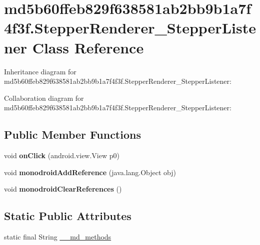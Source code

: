 \hypertarget{classmd5b60ffeb829f638581ab2bb9b1a7f4f3f_1_1_stepper_renderer___stepper_listener}{}\section{md5b60ffeb829f638581ab2bb9b1a7f4f3f.\+Stepper\+Renderer\+\_\+\+Stepper\+Listener Class Reference}
\label{classmd5b60ffeb829f638581ab2bb9b1a7f4f3f_1_1_stepper_renderer___stepper_listener}


Inheritance diagram for md5b60ffeb829f638581ab2bb9b1a7f4f3f.\+Stepper\+Renderer\+\_\+\+Stepper\+Listener\+:


Collaboration diagram for md5b60ffeb829f638581ab2bb9b1a7f4f3f.\+Stepper\+Renderer\+\_\+\+Stepper\+Listener\+:
\subsection*{Public Member Functions}
\begin{DoxyCompactItemize}
\item 
\mbox{\label{classmd5b60ffeb829f638581ab2bb9b1a7f4f3f_1_1_stepper_renderer___stepper_listener_ae013c0b5135d142b2c9092cba4e62af7}} 
void {\bfseries on\+Click} (android.\+view.\+View p0)
\item 
\mbox{\label{classmd5b60ffeb829f638581ab2bb9b1a7f4f3f_1_1_stepper_renderer___stepper_listener_aca2b5ea54afcdc9bbf86f2ca4d46b151}} 
void {\bfseries monodroid\+Add\+Reference} (java.\+lang.\+Object obj)
\item 
\mbox{\label{classmd5b60ffeb829f638581ab2bb9b1a7f4f3f_1_1_stepper_renderer___stepper_listener_aac50e9b6e66f8dcc19a5b7dfe491dad0}} 
void {\bfseries monodroid\+Clear\+References} ()
\end{DoxyCompactItemize}
\subsection*{Static Public Attributes}
\begin{DoxyCompactItemize}
\item 
static final String \hyperlink{classmd5b60ffeb829f638581ab2bb9b1a7f4f3f_1_1_stepper_renderer___stepper_listener_a477983b1cb4ddb1d26a31bca1d1d5f02}{\+\_\+\+\_\+md\+\_\+methods}
\end{DoxyCompactItemize}


